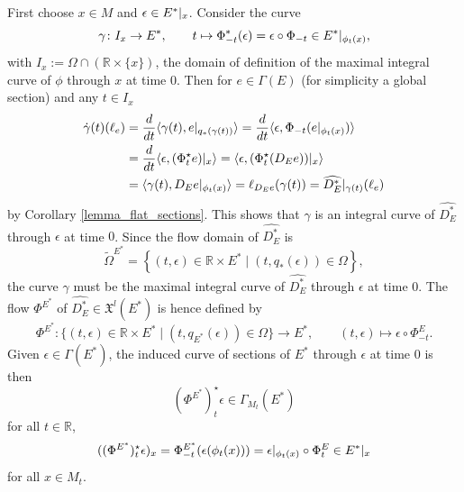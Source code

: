 \documentclass{amsart}
\theoremstyle{plain}
\newcommand{\R}{\mathbb{R}}
\newcommand{\mx}{\mathfrak{X}}
\newcommand{\an}[1]{\arrowvert_{#1}}
\begin{document}
\medskip
First choose $x\in M$ and $\epsilon\in E^*\an{x}$. Consider the curve 
\[ \gamma\colon I_x\to E^*, \qquad t\mapsto \Phi_{-t}^*(\epsilon)=\epsilon\circ\Phi_{-t}\in E^*\an{\phi_t(x)},
\]
with $I_x:=\Omega\cap(\mathbb R\times\{x\})$, the domain of definition of the maximal integral curve of $\phi$ through $x$ at time $0$.
Then for $e\in\Gamma(E)$ (for simplicity a global section) and any $t\in I_x$
\begin{equation*}
\begin{split}
\dot\gamma(t)(\ell_e)&=\frac{d}{dt}\langle \gamma(t), e\an{q_*(\gamma(t))}\rangle =\frac{d}{dt}\langle\epsilon,  \Phi_{-t}(e\an{\phi_t(x)})\rangle\\
&= \frac{d}{dt}\langle \epsilon, (\Phi_t^\star e)\an{x}\rangle=\langle \epsilon, (\Phi_t^\star(D_Ee))\an{x}\rangle\\
&=\langle \gamma(t), D_Ee\an{\phi_t(x)}\rangle=\ell_{D_Ee}(\gamma(t))=\widehat{D_E^*}\an{\gamma(t)}(\ell_e)
\end{split}
\end{equation*}
by Corollary \ref{lemma_flat_sections}.
This shows that $\gamma$ is an integral curve of $\widehat{D_E^*}$ through $\epsilon$ at time $0$. Since the flow domain of $\widehat{D_E^*}$ is 
\[ \widetilde{\Omega}^{E^*}=\left\{(t,\epsilon)\in \mathbb R\times E^*\mid (t, q_*(\epsilon))\in\Omega\right\},
\]
the curve $\gamma$ must be the maximal integral curve of $\widehat{D_E^*}$ through $\epsilon$ at time $0$.
The flow $\Phi^{E^*}$ of $\widehat{D_E^*}\in\mx^l(E^*)$ is hence defined by 
\begin{equation}\label{dual_flow} \Phi^{E^*}\colon \{(t, \epsilon)\in\R\times E^*\mid (t,q_{E^*}(\epsilon))\in\Omega\}\to E^*, 
\qquad  (t,\epsilon)\mapsto \epsilon\circ \Phi^E_{-t}.
\end{equation}
Given $\epsilon\in\Gamma(E^*)$, the induced curve of sections of $E^*$ through $\epsilon$ at time $0$  is then 
\[
(\Phi^{E^*})_t^\star\epsilon\in\Gamma_{M_t}(E^*)
\]
for all $t\in\mathbb R$, 
\[ ((\Phi^{E^*})_t^\star\epsilon)_x=\Phi^{E^*}_{-t}(\epsilon(\phi_t(x)))=\epsilon\an{\phi_t(x)}\circ \Phi^E_t\in E^*\an x
\]
for all $x\in M_t$.
\end{document}
